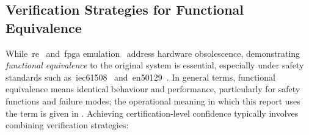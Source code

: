 \subsection{Verification Strategies for Functional Equivalence}
\label{subsec:equivalence_strategies}
While~\gls{re}~\cite{wang2010} and~\gls{fpga} emulation~\cite{guzman2011obsolescence} address hardware obsolescence, demonstrating \textit{functional equivalence} to the original system is essential, especially under safety standards such as~\gls{iec61508}~\cite{iec61508_2010} and~\gls{en50129}~\cite{en50129_2018}. In general terms, functional equivalence means identical behaviour and performance, particularly for safety functions and failure modes; the operational meaning in which this report uses the term is given in . Achieving certification-level confidence typically involves combining verification strategies:
